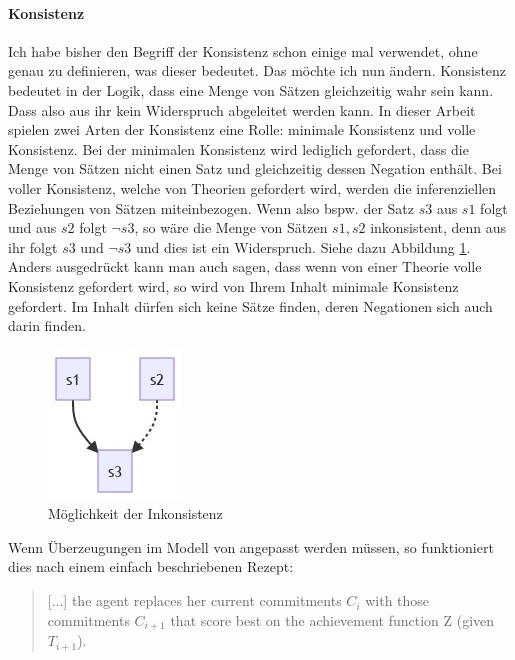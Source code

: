 \documentclass{article}
\begin{document}
\paragraph{Konsistenz\label{konsistenz}}
Ich habe bisher den Begriff der Konsistenz schon einige mal verwendet, ohne genau zu definieren, was dieser bedeutet. Das möchte ich nun ändern. Konsistenz bedeutet in der Logik, dass eine Menge von Sätzen gleichzeitig wahr sein kann. Dass also aus ihr kein Widerspruch abgeleitet werden kann. In dieser Arbeit spielen zwei Arten der Konsistenz eine Rolle: minimale Konsistenz und volle Konsistenz. Bei der minimalen Konsistenz wird lediglich gefordert, dass die Menge von Sätzen nicht einen Satz und gleichzeitig dessen Negation enthält. Bei voller Konsistenz, welche von Theorien gefordert wird, werden die inferenziellen Beziehungen von Sätzen miteinbezogen. Wenn also bspw. der Satz $s3$ aus $s1$ folgt und aus $s2$ folgt $\neg s3$, so wäre die Menge von Sätzen ${s1,s2}$ inkonsistent, denn aus ihr folgt $s3$ und $\neg s3$ und dies ist ein Widerspruch. Siehe dazu Abbildung \ref{fig:inconsistency}. Anders ausgedrückt kann man auch sagen, dass wenn von einer Theorie volle Konsistenz gefordert wird, so wird von Ihrem Inhalt minimale Konsistenz gefordert. Im Inhalt dürfen sich keine Sätze finden, deren Negationen sich auch darin finden.

\begin{figure}[ht]
  \centering
  \includegraphics{consistence.png}
  \caption{Möglichkeit der Inkonsistenz\label{fig:inconsistency}}
\end{figure}

Wenn Überzeugungen im Modell von \citeauthor{beisbart_making_2021} angepasst werden müssen, so funktioniert dies nach einem einfach beschriebenen Rezept:

\begin{quote}
    [...] the agent replaces her current commitments $C_i$ with those commitments $C_{i+1}$ that score best on the achievement function Z (given $T_{i+1}$).
    \autocite[S.~450]{beisbart_making_2021}
\end{quote}
\end{document}
